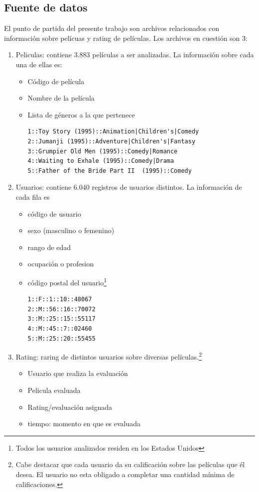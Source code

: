 \documentclass[journal]{IEEEtran}
\begin{document}
\subsection{Fuente de datos}
El punto de partida del presente trabajo son  archivos relacionados con información
sobre pelícuas y rating de películas. Los archivos en cuestión son 3:
\begin{enumerate}
	\item Peliculas: contiene 3.883 películas a ser analizadas. La información sobre cada
		una de ellas es:
		\begin{itemize}
			\item Código de película
			\item Nombre de la película
			\item Lista de géneros a la que pertenece
				\begin{lstlisting}[frame=single, breaklines=true]
1::Toy Story (1995)::Animation|Children's|Comedy
2::Jumanji (1995)::Adventure|Children's|Fantasy
3::Grumpier Old Men (1995)::Comedy|Romance
4::Waiting to Exhale (1995)::Comedy|Drama
5::Father of the Bride Part II  (1995)::Comedy
				\end{lstlisting}
		\end{itemize}


	\item Usuarios: contiene 6.040 registros de usuarios distintos. La información de cada
		fila es
		\begin{itemize}
			\item código de usuario
			\item sexo (masculino o femenino)
			\item rango de edad
			\item ocupación o profesion
			\item código postal del usuario\footnote{Todos los usuarios analizados residen 
			  en los Estados Unidos}
				\begin{lstlisting}[frame=single]
1::F::1::10::48067
2::M::56::16::70072
3::M::25::15::55117
4::M::45::7::02460
5::M::25::20::55455
				\end{lstlisting}
		\end{itemize}

	\item Rating: raring de distintos usuarios sobre diversas películas.\footnote{Cabe
		destacar que cada usuario da su calificación sobre las películas que él desea. El
		usuario no esta obligado a completar una cantidad mínima de calificaciones.}

		\begin{itemize}
			\item Usuario que realiza la evaluación
			\item Pelicula evaluada
			\item Rating/evaluación asignada
			\item tiempo: momento en que es evaluada


\end{itemize}
\end{enumerate}
\end{document}
